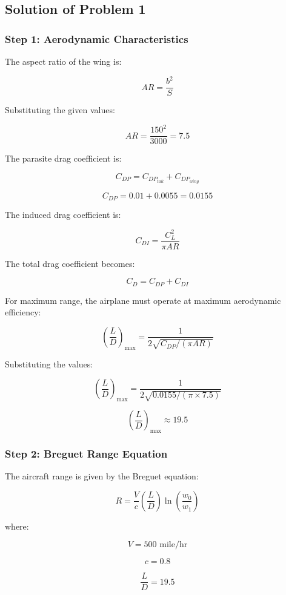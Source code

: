 \documentclass{KPS_assignment}
\begin{document}
\subsection*{Solution of Problem 1}

\subsubsection{Step 1: Aerodynamic Characteristics}

The aspect ratio of the wing is:

\[
AR=\frac{b^2}{S}
\]

Substituting the given values:

\[
AR=\frac{150^2}{3000}=7.5
\]

The parasite drag coefficient is:

\[
C_{DP}=C_{DP_{tail}}+C_{DP_{wing}}
\]

\[
C_{DP}=0.01+0.0055=0.0155
\]

The induced drag coefficient is:

\[
C_{DI}=\frac{C_L^2}{\pi AR}
\]

The total drag coefficient becomes:

\[
C_D=C_{DP}+C_{DI}
\]

For maximum range, the airplane must operate at maximum aerodynamic efficiency:

\[
\left(\frac{L}{D}\right)_{\max}
=
\frac{1}{2\sqrt{C_{DP}/(\pi AR)}}
\]

Substituting the values:

\[
\left(\frac{L}{D}\right)_{\max}
=
\frac{1}{2\sqrt{0.0155/(\pi\times7.5)}}
\]

\[
\boxed{
\left(\frac{L}{D}\right)_{\max}\approx19.5
}
\]


\subsubsection{Step 2: Breguet Range Equation}

The aircraft range is given by the Breguet equation:

\[
R=
\frac{V}{c}
\left(\frac{L}{D}\right)
\ln\left(\frac{w_0}{w_1}\right)
\]

where:

\[
V=500 \text{ mile/hr}
\]

\[
c=0.8
\]

\[
\frac{L}{D}=19.5
\]
\end{document}
